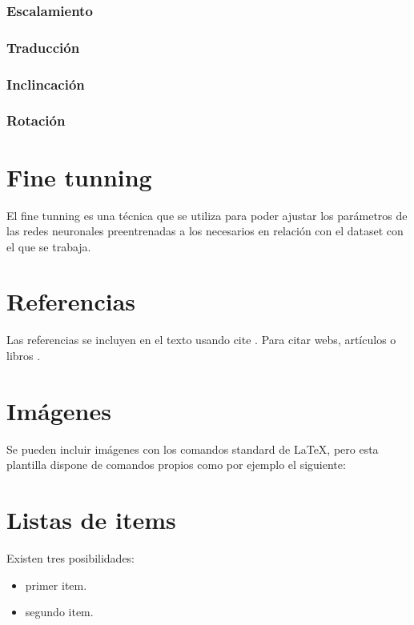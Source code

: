 \subsubsection{Escalamiento}

\subsubsection{Traducción}

\subsubsection{Inclincación}

\subsubsection{Rotación}

\section{Fine tunning}
El fine tunning es una técnica que se utiliza para poder ajustar los parámetros de las redes neuronales preentrenadas a los necesarios en relación con
el dataset con el que se trabaja.




\section{Referencias}

Las referencias se incluyen en el texto usando cite \cite{wiki:latex}. Para citar webs, artículos o libros \cite{koza92}.

\section{Imágenes}

Se pueden incluir imágenes con los comandos standard de \LaTeX, pero esta plantilla dispone de comandos propios como por ejemplo el siguiente:

\section{Listas de items}

Existen tres posibilidades:

\begin{itemize}
	\item primer item.
	\item segundo item.
\end{itemize}

